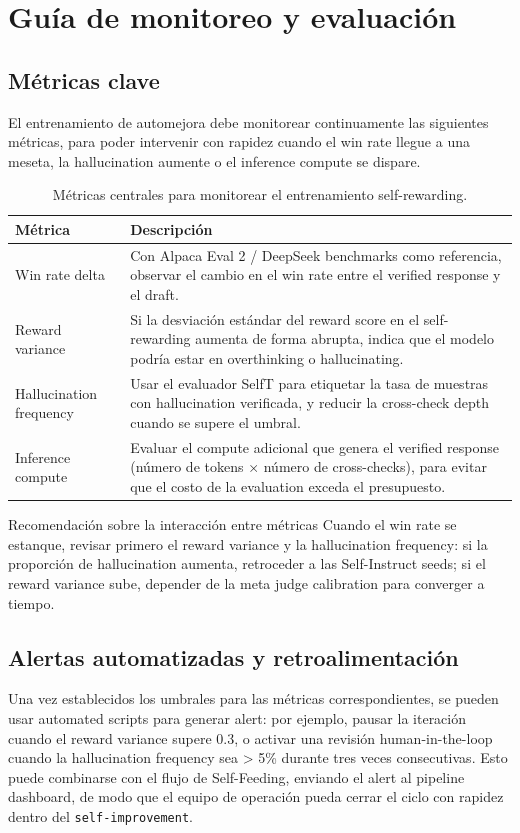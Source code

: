 \section{Guía de monitoreo y evaluación}
\subsection{Métricas clave}
El entrenamiento de automejora debe monitorear continuamente las siguientes métricas, para poder intervenir con rapidez cuando el win rate llegue a una meseta, la hallucination aumente o el inference compute se dispare.

\begin{table}[H]
\centering
\begin{tabular}{p{5cm}p{10cm}}
\toprule
Métrica & Descripción \\
\midrule
Win rate delta & Con Alpaca Eval 2 / DeepSeek benchmarks como referencia, observar el cambio en el win rate entre el verified response y el draft. \\
Reward variance & Si la desviación estándar del reward score en el self-rewarding aumenta de forma abrupta, indica que el modelo podría estar en overthinking o hallucinating. \\
Hallucination frequency & Usar el evaluador SelfT para etiquetar la tasa de muestras con hallucination verificada, y reducir la cross-check depth cuando se supere el umbral. \\
Inference compute & Evaluar el compute adicional que genera el verified response (número de tokens × número de cross-checks), para evitar que el costo de la evaluation exceda el presupuesto. \\
\bottomrule
\end{tabular}
\caption{Métricas centrales para monitorear el entrenamiento self-rewarding.}
\end{table}

\begin{importantbox}{Recomendación sobre la interacción entre métricas}
Cuando el win rate se estanque, revisar primero el reward variance y la hallucination frequency: si la proporción de hallucination aumenta, retroceder a las Self-Instruct seeds; si el reward variance sube, depender de la meta judge calibration para converger a tiempo.
\end{importantbox}

\subsection{Alertas automatizadas y retroalimentación}
Una vez establecidos los umbrales para las métricas correspondientes, se pueden usar automated scripts para generar alert: por ejemplo, pausar la iteración cuando el reward variance supere 0.3, o activar una revisión human-in-the-loop cuando la hallucination frequency sea > 5\% durante tres veces consecutivas. Esto puede combinarse con el flujo de Self-Feeding, enviando el alert al pipeline dashboard, de modo que el equipo de operación pueda cerrar el ciclo con rapidez dentro del \texttt{self-improvement}.

